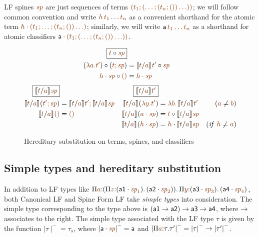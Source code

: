 LF spines $\lf\spi$ are just sequences of terms $\lf{(t_1; (\ldots;
  (t_n;())\ldots))}$; we will follow common convention and write
$\lf{h\,t_1\ldots t_n}$ as a convenient shorthand for the atomic term
$\lf{\lfroot{h}{(t_1; \ldots; (t_n;())\ldots)}}$; similarly, we will
write ${\sf a}\,\lf{t_1\ldots t_n}$ as a shorthand for atomic
classifiers $\lfroot{\sf a}{(t_1;
  (\ldots; (t_n;())\ldots))}$. %

\begin{figure}[t]
\begin{align*}
\fbox{$\subst{\lf{t}}{\lf{\spi}}$}
\\
\subst{(\lf{\lambda a. t'})}{(\lf{t; \spi})}
 & = \subst{\rsubst{\lf{t}}{\lf{a}}{\lf{t'}}}{\lf{\spi}}
\\
\subst{\lfroot{\lf h}{\spi}}{\lfnil}
 & = \lfroot{\lf h}{\spi}
\end{align*}\begin{align*}
\fbox{$\rsubst{\lf{t}}{\lf{a}}{\lf{\spi}}$}&
&
\fbox{$\rsubst{\lf{t}}{\lf{a}}{\lf{t'}}$}&
&
\\
\rsubst{\lf t}{\lf a}{(\lf{t'; \spi})}
 & = \lf{\no{\rsubst{\lf t}{\lf a}{\lf{t'}}}; 
         \no{\rsubst{\lf t}{\lf a}{\lf{\spi}}}} &
\rsubst{\lf t}{\lf a}(\lf{\lambda y. t'})
 & = \lf{\lambda b.\, \no{\rsubst{\lf t}{\lf a}{\lf{t'}}}} 
      & (\lf a \neq \lf b) 
\\
\rsubst{\lf t}{\lf a}{\lfnil} 
 & = \lfnil &
\rsubst{\lf t}{\lf a}{(\lf{\lfroot{a}{\spi}})}
 & = \subst{\lf t}{\rsubst{\lf t}{\lf a}{\lf{\spi}}}
\\
& & 
\rsubst{\lf t}{\lf a}{(\lf{\lfroot{h}{\spi}})}
 & = \lfroot{\lf h}{\no{\rsubst{\lf t}{\lf a}{\lf{\spi}}}}
      & ({\it if}~ \lf{h} \neq \lf{a})
\end{align*}
\caption{Hereditary substitution on terms, spines, and classifiers}
\label{fig:lf-hsubst}
\end{figure}

\subsection{Simple types and hereditary substitution}
\label{sec:lf-simpletypesandhsubst}

In addition to LF types like $\lfpi{a}{(\lfpi{z}{(\lfroot{\sf
      a1}{\spi_1})}{\,(\lfroot{\sf
      a2}{\spi_2})})}{\,\lfpi{y}{(\lfroot{\sf
      a3}{\spi_3})}{\,(\lfroot{\sf a4}{\spi_4})}}$, both Canonical LF
and Spine Form LF take {\it simple types} into consideration. The
simple type corresponding to the type above is $({\sf a1} \rightarrow {\sf
  a2}) \rightarrow {\sf a3} \rightarrow {\sf a4}$, where ${\rightarrow}$
associates to the right. The simple type associated with the 
LF type
$\tau$ is given by the function ${\mid}\tau{\mid}^- = \tau_s$, where
${\mid}\lfroot{\sf a}{\spi}{\mid}^- = {\sf a}$ and
${\mid}\lfpi{a}{\tau}{\tau'}{\mid}^- = {\mid}\tau{\mid}^- \simplearrow
{\mid}\tau'{\mid}^-$. 


